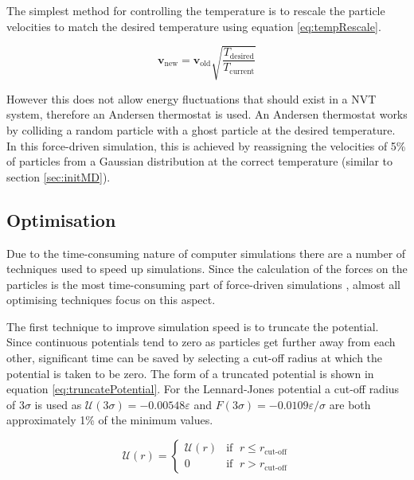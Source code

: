 \message{ !name(main.tex)}\documentclass[12pt]{UoAthesis}
\begin{document}
The simplest method for controlling the temperature is to rescale the
particle velocities to match the desired temperature using equation
\eqref{eq:tempRescale}. 

\begin{equation}
  \label{eq:tempRescale}
  \mathbf{v}_{\text{new}} = \mathbf{v}_{\text{old}} \sqrt{\frac{T_{\text{desired}}}{T_{\text{current}}}}
\end{equation}

However this does not allow energy fluctuations that should exist in a
NVT system, therefore an Andersen thermostat\cite{Andersen1980} is
used.  An Andersen thermostat works by colliding a random particle
with a ghost particle at the desired temperature.  In this
force-driven simulation, this is achieved by reassigning the
velocities of 5\% of particles from a Gaussian distribution at the
correct temperature (similar to section \ref{sec:initMD}).

\subsection{Optimisation}

Due to the time-consuming nature of computer simulations there are a
number of techniques used to speed up simulations.  Since the
calculation of the forces on the particles is the most time-consuming
part of force-driven simulations \cite{Frenkel2002}, almost all
optimising techniques focus on this aspect.

The first technique to improve simulation speed is to truncate the
potential.  Since continuous potentials tend to zero as particles get
further away from each other, significant time can be saved by
selecting a cut-off radius at which the potential is taken to be zero.
The form of a truncated potential is shown in equation
\eqref{eq:truncatePotential}.  For the Lennard-Jones potential a
cut-off radius of $3\sigma$ is used as $\mathcal{U}(3\sigma) =
-0.00548\varepsilon$ and $F(3\sigma) = -0.0109\varepsilon/\sigma$ are
both approximately 1\% of the minimum values.

\begin{equation}
  \label{eq:truncatePotential}
  \mathcal{U}(r) = 
  \begin{cases}
    \mathcal{U}(r) &\text{if }\; r \leq r_{\text{cut-off}} \\
    0 & \text{if }\; r > r_{\text{cut-off}} 
  \end{cases}
\end{equation}
\end{document}
